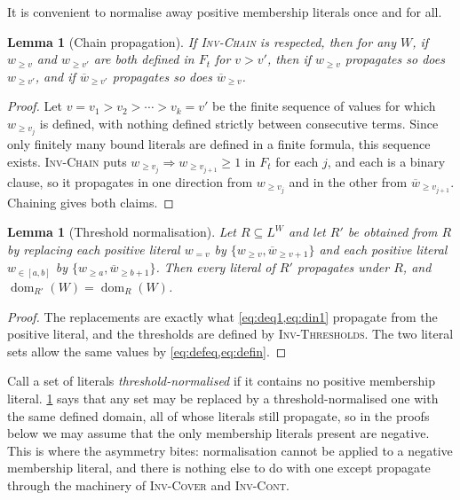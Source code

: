 \documentclass[11pt,a4paper]{article}
\theoremstyle{plain}
\newtheorem{lemmaT}{Lemma}
\newtheorem{lemmaN}{Lemma}
\theoremstyle{definition}
\theoremstyle{remark}
\newcommand{\fname}[1]{\ensuremath{\operatorname{#1}}}
\newcommand{\dm}{\fname{dom}}
\newcommand{\atge}[2]{#1_{\geq #2}}
\newcommand{\ateq}[2]{#1_{= #2}}
\newcommand{\atin}[3]{#1_{\in[#2,#3]}}
\newcommand{\natge}[2]{\overline{#1}_{\geq #2}}
\newcommand{\inv}[1]{\textnormal{\textsc{Inv-#1}}}
\newcommand{\invChain}{\inv{Chain}}
\newcommand{\invThresholds}{\inv{Thresholds}}
\newcommand{\invCover}{\inv{Cover}}
\newcommand{\invCont}{\inv{Cont}}
\begin{document}
It is convenient to normalise away positive membership literals once and for all.

\begin{lemmaT}[Chain propagation]
\label{lem:chain}
If \invChain{} is respected, then for any $W$, if $\atge{w}{v}$ and
$\atge{w}{v'}$ are both defined in $F_t$ for $v>v'$, then if $\atge{w}{v}$
propagates so does $\atge{w}{v'}$, and if $\natge{w}{v'}$ propagates
so does $\natge{w}{v}$.
\end{lemmaT}

\begin{proof}
Let $v = v_1 > v_2 > \cdots > v_k = v'$ be the finite sequence of values for
which $\atge{w}{v_j}$ is defined, with nothing defined strictly between
consecutive terms.  Since only finitely many bound literals are defined in a
finite formula, this sequence exists.  \invChain{} puts
$\atge{w}{v_j}\Rightarrow\atge{w}{v_{j+1}}\geq 1$ in $F_t$ for each $j$, and each
is a binary clause, so it propagates in one direction from $\atge{w}{v_j}$ and
in the other from $\natge{w}{v_{j+1}}$.  Chaining gives both claims.
\end{proof}

\begin{lemmaN}[Threshold normalisation]
\label{lem:normalise}
Let $R\subseteq L^W$ and let $R'$ be obtained from $R$ by replacing each
positive literal $\ateq{w}{v}$ by $\{\atge{w}{v},\natge{w}{v+1}\}$ and
each positive literal $\atin{w}{a}{b}$ by
$\{\atge{w}{a},\natge{w}{b+1}\}$.  Then every literal of $R'$
propagates under $R$, and $\dm_{R'}(W)=\dm_R(W)$.
\end{lemmaN}

\begin{proof}
The replacements are exactly what \cref{eq:deq1,eq:din1} propagate from the
positive literal, and the thresholds are defined by \invThresholds{}.  The two literal sets
allow the same values by \cref{eq:defeq,eq:defin}.
\end{proof}

Call a set of literals \emph{threshold-normalised} if it contains no positive
membership literal.  \cref{lem:normalise} says that any set may be replaced by
a threshold-normalised one with the same defined domain, all of whose literals still
propagate, so in the proofs below we may assume that the only membership literals
present are negative.  This is where the asymmetry bites: normalisation cannot be applied to
a negative membership literal, and there is nothing else to do with one except
propagate through the machinery of \invCover{} and \invCont{}.
\end{document}
